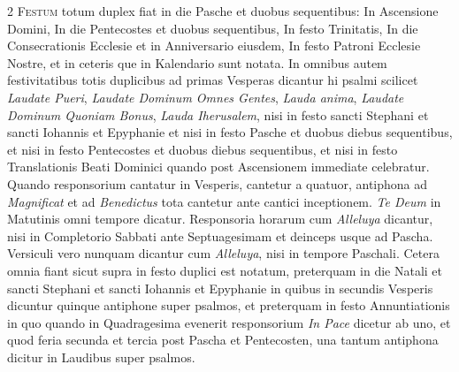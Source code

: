 \begin{multicols*}{2}
{\color{Red} }
\lettrine[lines=2]{\zallmancaps \color{Blue} F}{estum} totum duplex fiat in die Pasche et duobus sequentibus: In Ascensione Domini, In die Pentecostes et duobus sequentibus, In festo Trinitatis, In die Consecrationis Ecclesie et in Anniversario eiusdem, In festo Patroni Ecclesie Nostre, et in ceteris que in Kalendario sunt notata.
In omnibus autem festivitatibus totis duplicibus ad primas Vesperas dicantur hi psalmi scilicet \textit{Laudate Pueri}, \textit{Laudate Dominum Omnes Gentes}, \textit{Lauda anima}, \textit{Laudate Dominum Quoniam Bonus}, \textit{Lauda Iherusalem}, nisi in festo sancti Stephani et sancti Iohannis et Epyphanie et nisi in festo Pasche et duobus diebus sequentibus, et nisi in festo Pentecostes et duobus diebus sequentibus, et nisi in festo Translationis Beati Dominici quando post Ascensionem immediate celebratur. Quando responsorium cantatur in Vesperis, cantetur a quatuor, antiphona ad \textit{Magnificat} et ad \textit{Benedictus} tota cantetur ante cantici inceptionem. \textit{Te Deum} in Matutinis omni tempore dicatur. Responsoria horarum cum \textit{Alleluya} dicantur, nisi in Completorio Sabbati ante Septuagesimam et deinceps usque ad Pascha. Versiculi vero nunquam dicantur cum \textit{Alleluya}, nisi in tempore Paschali.
Cetera omnia fiant sicut supra in festo duplici est notatum, preterquam in die Natali et sancti Stephani et sancti Iohannis et Epyphanie in quibus in secundis Vesperis dicuntur quinque antiphone super psalmos, et preterquam in festo Annuntiationis in quo quando in Quadragesima evenerit responsorium \textit{In Pace} dicetur ab uno, et quod feria secunda et tercia post Pascha et Pentecosten, una tantum antiphona dicitur in Laudibus super psalmos.




\end{multicols*}
